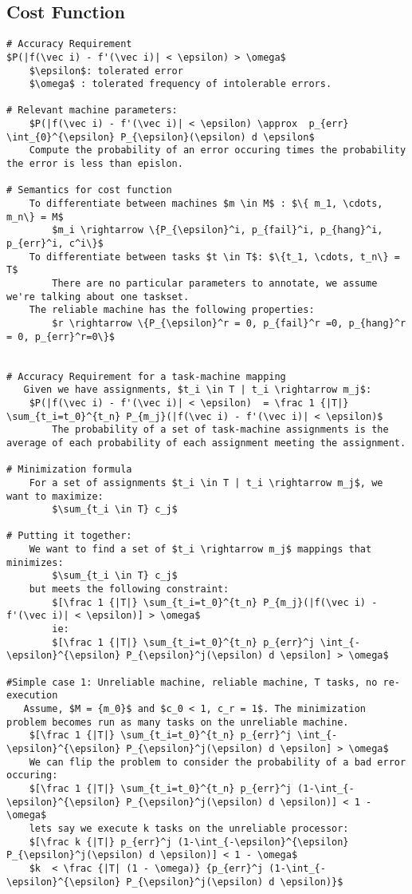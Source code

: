 \documentclass[11pt, oneside]{article}   	%
\begin{document}
\subsection {Cost Function}
\begin{lstlisting}[mathescape]
# Accuracy Requirement
$P(|f(\vec i) - f'(\vec i)| < \epsilon) > \omega$
	$\epsilon$: tolerated error
	$\omega$ : tolerated frequency of intolerable errors.
	
# Relevant machine parameters:
	$P(|f(\vec i) - f'(\vec i)| < \epsilon) \approx  p_{err} \int_{0}^{\epsilon} P_{\epsilon}(\epsilon) d \epsilon$
	Compute the probability of an error occuring times the probability the error is less than epislon.

# Semantics for cost function
	To differentiate between machines $m \in M$ : $\{ m_1, \cdots, m_n\} = M$
		$m_i \rightarrow \{P_{\epsilon}^i, p_{fail}^i, p_{hang}^i, p_{err}^i, c^i\}$
	To differentiate between tasks $t \in T$: $\{t_1, \cdots, t_n\} = T$
		There are no particular parameters to annotate, we assume we're talking about one taskset.
	The reliable machine has the following properties:
		$r \rightarrow \{P_{\epsilon}^r = 0, p_{fail}^r =0, p_{hang}^r = 0, p_{err}^r=0\}$


# Accuracy Requirement for a task-machine mapping
   Given we have assignments, $t_i \in T | t_i \rightarrow m_j$:
   	$P(|f(\vec i) - f'(\vec i)| < \epsilon)  = \frac 1 {|T|} \sum_{t_i=t_0}^{t_n} P_{m_j}(|f(\vec i) - f'(\vec i)| < \epsilon)$
   		The probability of a set of task-machine assignments is the average of each probability of each assignment meeting the assignment.

# Minimization formula
	For a set of assignments $t_i \in T | t_i \rightarrow m_j$, we want to maximize:
		$\sum_{t_i \in T} c_j$
		
# Putting it together:
	We want to find a set of $t_i \rightarrow m_j$ mappings that minimizes:
		$\sum_{t_i \in T} c_j$
	but meets the following constraint:	
		$[\frac 1 {|T|} \sum_{t_i=t_0}^{t_n} P_{m_j}(|f(\vec i) - f'(\vec i)| < \epsilon)] > \omega$
		ie:
		$[\frac 1 {|T|} \sum_{t_i=t_0}^{t_n} p_{err}^j \int_{-\epsilon}^{\epsilon} P_{\epsilon}^j(\epsilon) d \epsilon] > \omega$
		
#Simple case 1: Unreliable machine, reliable machine, T tasks, no re-execution  		
   Assume, $M = {m_0}$ and $c_0 < 1, c_r = 1$. The minimization problem becomes run as many tasks on the unreliable machine.
	$[\frac 1 {|T|} \sum_{t_i=t_0}^{t_n} p_{err}^j \int_{-\epsilon}^{\epsilon} P_{\epsilon}^j(\epsilon) d \epsilon] > \omega$
	We can flip the problem to consider the probability of a bad error occuring:
	$[\frac 1 {|T|} \sum_{t_i=t_0}^{t_n} p_{err}^j (1-\int_{-\epsilon}^{\epsilon} P_{\epsilon}^j(\epsilon) d \epsilon)] < 1 - \omega$
	lets say we execute k tasks on the unreliable processor:
	$[\frac k {|T|} p_{err}^j (1-\int_{-\epsilon}^{\epsilon} P_{\epsilon}^j(\epsilon) d \epsilon)] < 1 - \omega$
  	$k  < \frac {|T| (1 - \omega)} {p_{err}^j (1-\int_{-\epsilon}^{\epsilon} P_{\epsilon}^j(\epsilon) d \epsilon)}$
  	

\end{lstlisting}
\end{document}
